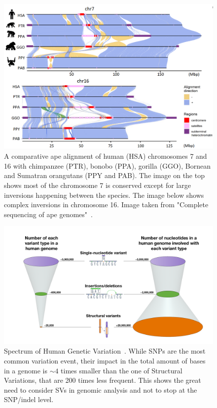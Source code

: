 \begin{figure}[!ht]
	\centering
	\includegraphics[width=\linewidth]{figures/background/genome_diff.png}
	\caption[Genomic difference in chromosome 7 and 16 of 5 primate species.]{A comparative ape alignment of human (HSA) chromosomes 7 and 16 with chimpanzee (PTR), bonobo (PPA), gorilla (GGO), Bornean and Sumatran orangutans (PPY and PAB). The image on the top shows most of the chromosome 7 is conserved except for large inversions happening between the species. The image below shows complex inversions in chromosome 16. Image taken from "Complete sequencing of ape genomes"~\cite{ape_genomes}.}
	\label{fig:chromosome_diff}
\end{figure}

\begin{figure}[!ht]\clearpage
	\centering
	\includegraphics[width=.95\linewidth]{figures/background/genomic_spectrum.png}
	\caption[Spectrum of Human Genetic Variation.]{Spectrum of Human Genetic Variation~\cite{nih_variation}. While SNPs are the most common variation event, their impact in the total amount of bases in a genome is $\sim4$ times smaller than the one of Structural Variations, that are 200 times less frequent. This shows the great need to consider SVs in genomic analysis and not to stop at the SNP/indel level.\\}
	\label{fig:variation_spectrum}
\end{figure}

